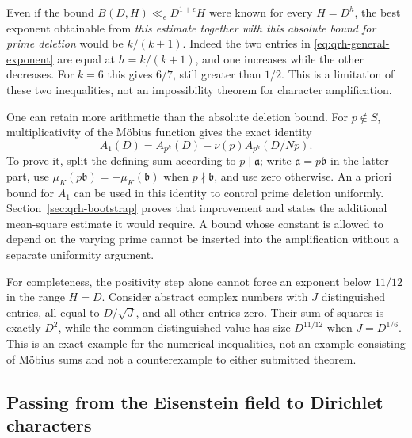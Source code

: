 Even if the bound $B(D,H)\ll_\epsilon D^{1+\epsilon}H$
were known for every $H=D^h$, the best exponent obtainable
from \emph{this estimate together with this absolute bound for
prime deletion} would be $k/(k+1)$. Indeed the two entries in
\eqref{eq:qrh-general-exponent} are equal at
$h=k/(k+1)$, and one increases while the other decreases.
For $k=6$ this gives $6/7$, still greater than $1/2$.
This is a limitation of these two inequalities, not an
impossibility theorem for character amplification.

One can retain more arithmetic than the absolute deletion
bound. For $p\notin S$, multiplicativity of the M\"obius function
gives the exact identity
\begin{equation}\label{eq:qrh-prime-removal}
 A_1(D)=A_{p^k}(D)-\nu(p)A_{p^k}(D/Np).
\end{equation}
To prove it, split the defining sum according to $p\mid\mathfrak a$;
write $\mathfrak a=p\mathfrak b$ in the latter part, use
$\mu_K(p\mathfrak b)=-\mu_K(\mathfrak b)$ when $p\nmid\mathfrak b$,
and use zero otherwise. An a priori bound for $A_1$ can be used
in this identity to control prime deletion uniformly. Section~\ref{sec:qrh-bootstrap}
proves that improvement and states the additional mean-square estimate
it would require. A bound whose constant is allowed to depend on the
varying prime cannot be inserted into the amplification without a
separate uniformity argument.

For completeness, the positivity step alone cannot force
an exponent below $11/12$ in the range $H=D$. Consider abstract
complex numbers with $J$ distinguished entries, all equal to
$D/\sqrt J$, and all other entries zero. Their sum of squares
is exactly $D^2$, while the common distinguished value has
size $D^{11/12}$ when $J=D^{1/6}$.
This is an exact example for the numerical inequalities, not
an example consisting of M\"obius sums and not a counterexample
to either submitted theorem.

\subsection{Passing from the Eisenstein field to Dirichlet characters}

